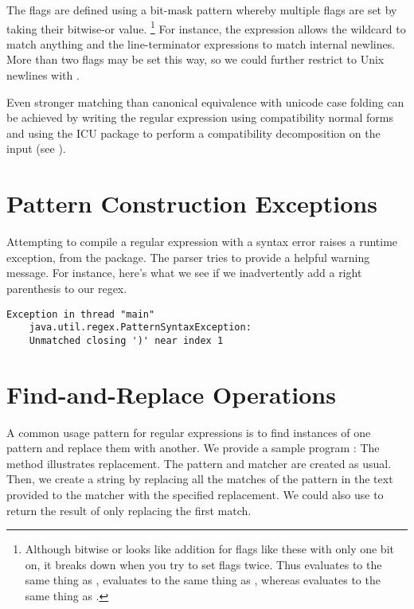 The flags are defined using a bit-mask pattern whereby multiple
flags are set by taking their bitwise-or value.%
%
\footnote{Although bitwise or looks like addition for flags like
these with only one bit on, it breaks down when you try to set
flags twice.  Thus  evaluates to the
same thing as , 
evaluates to the same thing as , whereas
 evaluates to the same thing as .}
%
For instance,
the expression  allows the wildcard
to match anything and the line-terminator expressions to match
internal newlines.  More than two flags may be set this way,
so we could further restrict to Unix newlines with
.  

Even stronger matching than canonical equivalence with unicode case
folding can be achieved by writing the regular expression using
compatibility normal forms and using the ICU package to perform a
compatibility decomposition on the input (see
).


\section{Pattern Construction Exceptions}

Attempting to compile a regular expression with a syntax error raises
a runtime exception,  from the
 package.  The parser tries to provide a helpful
warning message.  For instance, here's what we see if we inadvertently
add a right parenthesis to our regex.
%
%
\begin{verbatim}
Exception in thread "main" 
    java.util.regex.PatternSyntaxException:  
    Unmatched closing ')' near index 1
\end{verbatim}


\section{Find-and-Replace Operations}\label{section:regex-replace}

A common usage pattern for regular expressions is to find instances of
one pattern and replace them with another.  We provide a sample
program :
%
%
The  method illustrates replacement.
%
%
The pattern and matcher are created as usual.  Then, we create
a string by replacing all the matches of the pattern in the text
provided to the matcher with the specified replacement.  We could
also use  to return the result of only replacing
the first match.

